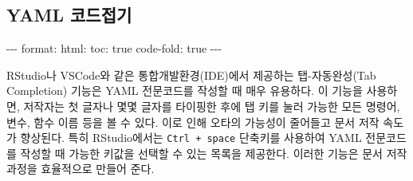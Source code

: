\documentclass[
  letterpaper,
]{book}
\newenvironment{Shaded}{\begin{snugshade}}{\end{snugshade}}
\newcommand{\AttributeTok}[1]{\textcolor[rgb]{0.40,0.45,0.13}{#1}}
\newcommand{\CharTok}[1]{\textcolor[rgb]{0.13,0.47,0.30}{#1}}
\newcommand{\ExtensionTok}[1]{\textcolor[rgb]{0.00,0.23,0.31}{#1}}
\newcommand{\FunctionTok}[1]{\textcolor[rgb]{0.28,0.35,0.67}{#1}}
\newcommand{\KeywordTok}[1]{\textcolor[rgb]{0.00,0.23,0.31}{#1}}
\newcommand{\NormalTok}[1]{\textcolor[rgb]{0.00,0.23,0.31}{#1}}
\newcommand{\PreprocessorTok}[1]{\textcolor[rgb]{0.68,0.00,0.00}{#1}}
\begin{document}
\begin{Shaded}
\end{Shaded}

\hypertarget{yaml-uxcf54uxb4dcuxc811uxae30}{%
\subsection*{YAML 코드접기}\label{yaml-uxcf54uxb4dcuxc811uxae30}}

\begin{Shaded}
\begin{Highlighting}[]
\PreprocessorTok{{-}{-}{-}}
\FunctionTok{format}\KeywordTok{:}\AttributeTok{ }
\AttributeTok{  }\FunctionTok{html}\KeywordTok{:}
\AttributeTok{    }\FunctionTok{toc}\KeywordTok{:}\AttributeTok{ }\CharTok{true}
\AttributeTok{    }\FunctionTok{code{-}fold}\KeywordTok{:}\AttributeTok{ }\CharTok{true}
\PreprocessorTok{{-}{-}{-}}
\end{Highlighting}
\end{Shaded}

RStudio나 VSCode와 같은 통합개발환경(IDE)에서 제공하는 탭-자동완성(Tab
Completion) 기능은 YAML 전문코드를 작성할 때 매우 유용하다. 이 기능을
사용하면, 저작자는 첫 글자나 몇몇 글자를 타이핑한 후에 탭 키를 눌러
가능한 모든 명령어, 변수, 함수 이름 등을 볼 수 있다. 이로 인해 오타의
가능성이 줄어들고 문서 저작 속도가 향상된다. 특히 RStudio에서는
\texttt{Ctrl\ +\ space} 단축키를 사용하여 YAML 전문코드를 작성할 때
가능한 키값을 선택할 수 있는 목록을 제공한다. 이러한 기능은 문서 저작
과정을 효율적으로 만들어 준다.
\end{document}
